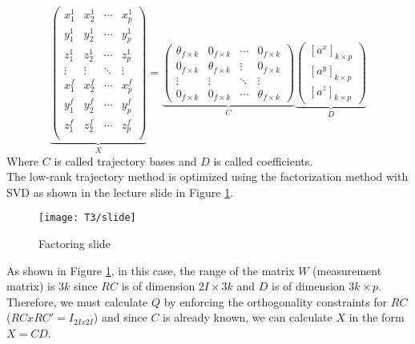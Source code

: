\begin{equation}\label{eq:shape_trajectory}	
	\underbrace{\begin{pmatrix}
		x_{1}^{1} & x_{2}^{1} & \cdots & x_{p}^{1}\\
		y_{1}^{1} & y_{2}^{1} & \cdots & y_{p}^{1}\\
		z_{1}^{1} & z_{2}^{1} & \cdots & z_{p}^{1}\\
		\vdots & \vdots & \ddots & \vdots \\
		x_{1}^{f} & x_{2}^{f} & \cdots & x_{p}^{f}\\
		y_{1}^{f} & y_{2}^{f} & \cdots & y_{p}^{f}\\
		z_{1}^{f} & z_{2}^{f} & \cdots & z_{p}^{f}\\
	\end{pmatrix}}_{X}=
	\underbrace{\begin{pmatrix}
		\theta_{f\times k} & 0_{f\times k} & \cdots & 0_{f\times k} \\		
		0_{f\times k} &  \theta_{f\times k} & \vdots & 0_{f\times k}\\
		\vdots &  \vdots &\ddots & \vdots \\
		0_{f\times k} & 0_{f\times k} &  \cdots & \theta_{f\times k}		
	\end{pmatrix}}_{C}
	\underbrace{\begin{pmatrix}
				[a^{x}]_{k\times p} \\		
				[a^{y}]_{k\times p} \\
				[a^{z}]_{k\times p}				
		\end{pmatrix}}_{D}
\end{equation} 
\noindent Where $C$ is called trajectory bases and $D$ is called coefficients.\\

\noindent The low-rank trajectory method is optimized using the factorization method with SVD as shown in the lecture slide in Figure \ref{fig:slideT3}.\\

\begin{figure}[h]
	\centering
	\texttt{[image: T3/slide]}
	\caption{Factoring slide}
	\label{fig:slideT3}
\end{figure}

\noindent As shown in Figure \ref{fig:slideT3}, in this case, the range of the matrix $W$ (measurement matrix) is $3k$ since $RC$ is of dimension $2I\times 3k$ and $D$ is of dimension $3k\times p$. Therefore, we must calculate $Q$ by enforcing the orthogonality constraints for $RC$ ($RCxRC'=I_{2Ix2I}$) and since $C$ is already known, we can calculate $X$ in the form $X=CD$.\\
